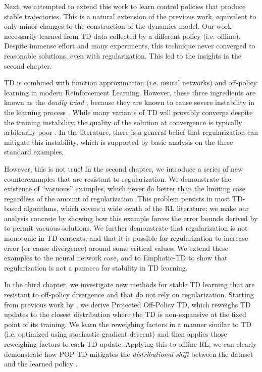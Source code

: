 \documentclass[11pt]{book}
\begin{document}
Next, we attempted to extend this work to learn control policies that produce stable trajectories. This is a natural extension of the previous work, equivalent to only minor changes to the construction of the dynamics model. Our work necessarily learned from TD data collected by a different policy (i.e. offline). Despite immense effort and many experiments, this technique never converged to reasonable solutions, even with regularization. This led to the insights in the second chapter.

TD is combined with function approximation (i.e. neural networks) and off-policy learning in modern Reinforcement Learning. However, these three ingredients are known as the \emph{deadly triad} \cite[p.~264]{sutton2020reinforcement}, because they are known to cause severe instability in the learning process \citet{tsitsiklis1996analysis}. While many variants of TD will provably converge despite the training instability, the quality of the solution at convergence is typically arbitrarily poor \citep{kolter2011fixed}. In the literature, there is a general belief that regularization can mitigate this instability, which is supported by basic analysis on the three standard examples.

However, this is not true! In the second chapter, we introduce a series of new counterexamples that are resistant to regularization. We demonstrate the existence of ``vacuous'' examples, which never do better than the limiting case regardless of the amount of regularization. This problem persists in most TD-based algorithms, which covers a wide swath of the RL literature; we make our analysis concrete by showing how this example forces the error bounds derived by \citet{zhang2021breaking} to permit vacuous solutions. We further demonstrate that regularization is not monotonic in TD contexts, and that it is possible for regularization to increase error (or cause divergence) around some critical values. We extend these examples to the neural network case, and to Emphatic-TD to show that regularization is not a panacea for stability in TD learning.

In the third chapter, we investigate new methods for stable TD learning that are resistant to off-policy divergence and that do not rely on regularization. Starting from previous work by \citet{kolter2011fixed}, we derive Projected Off-Policy TD, which reweighs TD updates to the closest distribution where the TD is non-expansive at the fixed point of its training. We learn the reweighing factors in a manner similar to TD (i.e. optimized using stochastic gradient descent) and then applies those reweighing factors to each TD update. Applying this to offline RL, we can clearly demonstrate how POP-TD mitigates the \emph{distributional shift} between the dataset and the learned policy \cite{levine2020survey}.
\end{document}
